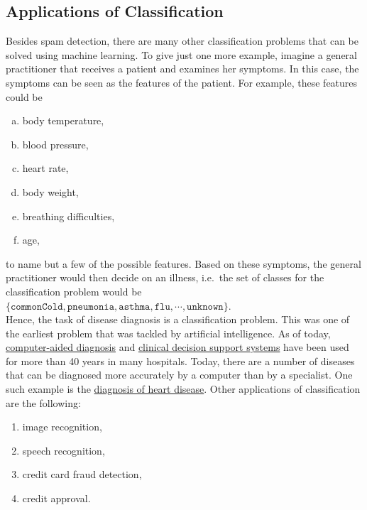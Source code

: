\subsection{Applications of Classification}
Besides spam detection, there are many other classification problems that can be solved using machine learning.  To give
just one more example, imagine a general practitioner that receives a patient and examines her symptoms.  In this case,
the symptoms can be seen as the features of the patient.  For example, these features could be
\begin{enumerate}[(a)]
\item body temperature,
\item blood pressure,
\item heart rate,
\item body weight,
\item breathing difficulties,
\item age,
\end{enumerate}
to name but a few of the possible features.  Based on these symptoms, the general practitioner would then decide on an
illness, i.e.~the set of classes for the classification problem would be
\\[0.2cm]
\hspace*{1.3cm}
$\{ \mathtt{commonCold}, \mathtt{pneumonia}, \mathtt{asthma}, \mathtt{flu}, \cdots, \mathtt{unknown} \}$.
\\[0.2cm]
Hence, the task of disease diagnosis is a classification problem.  This was one of the earliest problem that was tackled
by artificial intelligence.  As of today, 
\href{https://en.wikipedia.org/wiki/Computer-aided_diagnosis}{computer-aided diagnosis} and 
\href{https://en.wikipedia.org/wiki/Clinical_decision_support_system}{clinical decision support systems}
have been used for more than 40 years in many hospitals.  Today, there are a number of diseases that can be
diagnosed more accurately by a computer than by a specialist.  One such example is the
\href{http://www.ultromics.com}{diagnosis of heart disease}.  Other applications of classification are the following:
\begin{enumerate}
\item image recognition,
\item speech recognition,
\item credit card fraud detection,
\item credit approval.
\end{enumerate}

